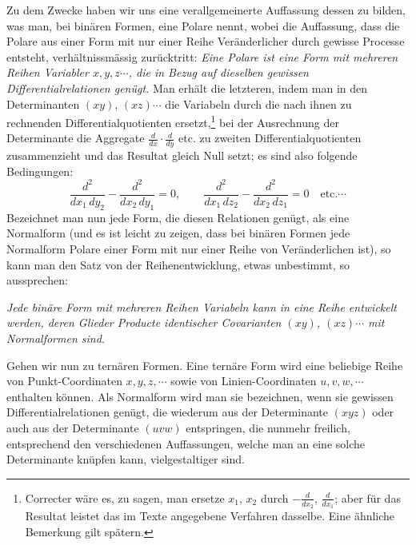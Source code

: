\documentclass[10pt]{article}
\providecommand{\bdots}{\cdots}
\begin{document}
Zu dem Zwecke haben wir uns eine verallgemeinerte Auffassung dessen zu bilden, was man, bei binären Formen, eine Polare nennt, wobei die Auffassung, dass die Polare aus einer Form mit nur einer Reihe Veränderlicher durch gewisse Processe entsteht, verhältnissmässig zurücktritt: \textit{Eine Polare ist eine Form mit mehreren Reihen Variabler $x,y,z\bdots$, die in Bezug auf dieselben gewissen Differentialrelationen genügt.} Man erhält die letzteren, indem man in den Determinanten $(xy)$, $(xz)\bdots$ die Variabeln durch die nach ihnen zu rechnenden Differentialquotienten ersetzt,\footnote{Correcter wäre es, zu sagen, man ersetze $x_1$, $x_2$ durch $-\frac{d}{dx_2}$, $\frac{d}{dx_1}$; aber für das Resultat leistet das im Texte angegebene Verfahren dasselbe. Eine ähnliche Bemerkung gilt spätern.} bei der Ausrechnung der Determinante die Aggregate $\frac d{dx}\cdot\frac d{dy}$ etc. zu zweiten Differentialquotienten zusammenzieht und das Resultat gleich Null setzt; es sind also folgende Bedingungen:
\[
\frac{d^2}{dx_1\,dy_2}-\frac{d^2}{dx_2\,dy_1}=0,
\qquad
\frac{d^2}{dx_1\,dz_2}-\frac{d^2}{dx_2\,dz_1}=0
\quad\text{etc.}\bdots
\]
Bezeichnet man nun jede Form, die diesen Relationen genügt, als eine Normalform (und es ist leicht zu zeigen, dass bei binären Formen jede Normalform Polare einer Form mit nur einer Reihe von Veränderlichen ist), so kann man den Satz von der Reihenentwicklung, etwas unbestimmt, so aussprechen:

\textit{Jede binäre Form mit mehreren Reihen Variabeln kann in eine Reihe entwickelt werden, deren Glieder Producte identischer Covarianten $(xy)$, $(xz)\bdots$ mit Normalformen sind.}

Gehen wir nun zu ternären Formen. Eine ternäre Form wird eine beliebige Reihe von Punkt-Coordinaten $x,y,z,\bdots$ sowie von Linien-Coordinaten $u,v,w,\bdots$ enthalten können. Als Normalform wird man sie bezeichnen, wenn sie gewissen Differentialrelationen genügt, die wiederum aus der Determinante $(xyz)$ oder auch aus der Determinante $(uvw)$ entspringen, die nunmehr freilich, entsprechend den verschiedenen Auffassungen, welche man an eine solche Determinante knüpfen kann, vielgestaltiger sind.
\end{document}
